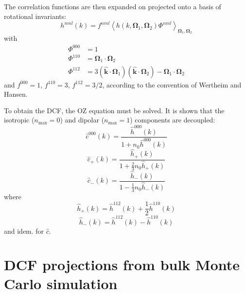 The correlation functions are then expanded on projected onto a basis
of rotational invariants:
\begin{equation}
h^{nml}(k)=f^{nml}\left\langle h(k,\mathbf{\Omega}_{1},\mathbf{\Omega}_{2})\Phi^{nml}\right\rangle _{\mathbf{\Omega}_{1},\mathbf{\Omega}_{2}}
\end{equation}
with
\begin{align}
\Phi^{000} & =1\nonumber \\
\Phi^{110} & =\mathbf{\Omega}_{1}\cdot\mathbf{\Omega}_{2}\\
\Phi^{112} & =3(\hat{\mathbf{k}}\cdot\mathbf{\Omega}_{1})(\hat{\mathbf{k}}\cdot\mathbf{\Omega}_{2})-\mathbf{\Omega}_{1}\cdot\mathbf{\Omega}_{2}\nonumber 
\end{align}
and $f^{000}=1$, $f^{110}=3$, $f^{112}=3/2$, according to the convention
of Wertheim and Hansen.

To obtain the \acs{DCF}, the \acs{OZ} equation must be solved. It
is shown that the isotropic ($n_{\max}=0$) and dipolar ($n_{\max}=1$)
components are decoupled:
\begin{equation}
\hat{c}^{000}(k)=\frac{\hat{h}^{000}(k)}{1+n_{0}\hat{h}^{000}(k)}
\end{equation}
\begin{equation}
\hat{c}_{+}(k)=\frac{\hat{h}_{+}(k)}{1+\frac{2}{3}n_{0}\hat{h}_{+}(k)}
\end{equation}
\begin{equation}
\hat{c}_{-}(k)=\frac{\hat{h}_{-}(k)}{1-\frac{1}{3}n_{0}\hat{h}_{-}(k)}
\end{equation}
where
\begin{equation}
\hat{h}_{+}(k)=\hat{h}^{112}(k)+\frac{1}{2}\hat{h}^{110}(k)
\end{equation}
\begin{equation}
\hat{h}_{-}(k)=\hat{h}^{112}(k)-\hat{h}^{110}(k)
\end{equation}
and idem. for $\hat{c}$.

\section{DCF projections from bulk Monte Carlo simulation}

